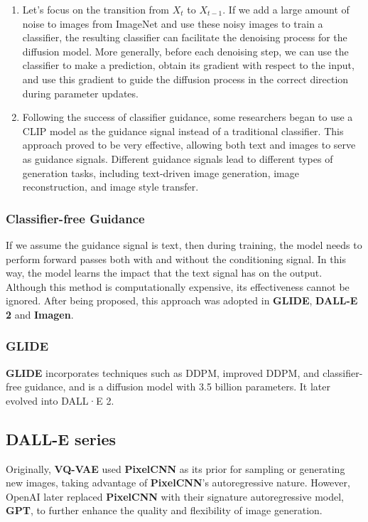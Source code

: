 \documentclass{article}
\begin{document}
\begin{enumerate}
    \item Let's focus on the transition from $X_t$ to $X_{t-1}$. If we add a large amount of noise to images 
    from ImageNet and use these noisy images to train a classifier, the resulting classifier can facilitate 
    the denoising process for the diffusion model. More generally, before each denoising step, we can use 
    the classifier to make a prediction, obtain its gradient with respect to the input, and use this 
    gradient to guide the diffusion process in the correct direction during parameter updates.
    \item Following the success of classifier guidance, some researchers began to use a CLIP model as the 
    guidance signal instead of a traditional classifier. This approach proved to be very effective, allowing 
    both text and images to serve as guidance signals. Different guidance signals lead to different types of 
    generation tasks, including text-driven image generation, image reconstruction, and image style transfer.
\end{enumerate}

\subsubsection{Classifier-free Guidance}

If we assume the guidance signal is text, then during training, the model needs to perform forward passes 
both with and without the conditioning signal. In this way, the model learns the impact that the text signal 
has on the output. Although this method is computationally expensive, its effectiveness cannot be ignored. 
After being proposed, this approach was adopted in \textbf{GLIDE}, \textbf{DALL-E 2} and \textbf{Imagen}.

\subsubsection{GLIDE}

\textbf{GLIDE} incorporates techniques such as DDPM, improved DDPM, and classifier-free guidance, and is a 
diffusion model with 3.5 billion parameters. It later evolved into DALL·E 2.

\subsection{DALL-E series}

Originally, \textbf{VQ-VAE} used \textbf{PixelCNN} as its prior for sampling or generating new images, taking 
advantage of \textbf{PixelCNN}'s autoregressive nature. However, OpenAI later replaced \textbf{PixelCNN} 
with their signature autoregressive model, \textbf{GPT}, to further enhance the quality and flexibility of 
image generation.
\end{document}
